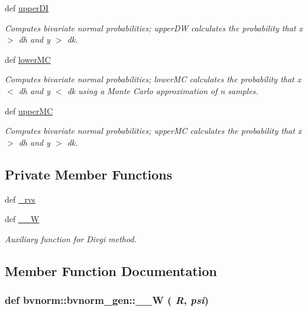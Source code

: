 \begin{CompactItemize}
def \hyperlink{classbvnorm_1_1bvnorm__gen_a21b04c4ce48d3215ead047576149238}{upperDI}
\begin{CompactList}\small\item\em Computes bivariate normal probabilities; upperDW calculates the probability that x $>$ dh and y $>$ dk. \item\end{CompactList}\item 
def \hyperlink{classbvnorm_1_1bvnorm__gen_86b9c8b6b258da3a7eb66cd91b00416b}{lowerMC}
\begin{CompactList}\small\item\em Computes bivariate normal probabilities; lowerMC calculates the probability that x $<$ dh and y $<$ dk using a Monte Carlo approximation of n samples. \item\end{CompactList}\item 
def \hyperlink{classbvnorm_1_1bvnorm__gen_65e19caa62c397d0e2de0e4d66a57d26}{upperMC}
\begin{CompactList}\small\item\em Computes bivariate normal probabilities; upperMC calculates the probability that x $>$ dh and y $>$ dk. \item\end{CompactList}\end{CompactItemize}
\subsection*{Private Member Functions}
\begin{CompactItemize}
\item 
def \hyperlink{classbvnorm_1_1bvnorm__gen_1f85ab2898c7ce352de4eaa9b47d6817}{\_\-rvs}
\item 
def \hyperlink{classbvnorm_1_1bvnorm__gen_5c395f39255b5b08cc050672e0094ca5}{\_\-\_\-W}
\begin{CompactList}\small\item\em Auxiliary function for Divgi method. \item\end{CompactList}\end{CompactItemize}


\subsection{Member Function Documentation}
\hypertarget{classbvnorm_1_1bvnorm__gen_5c395f39255b5b08cc050672e0094ca5}{
\subsubsection[{\_\-\_\-W}]{\setlength{\rightskip}{0pt plus 5cm}def bvnorm::bvnorm\_\-gen::\_\-\_\-W ( {\em R}, \/   {\em psi})}}
\label{classbvnorm_1_1bvnorm__gen_5c395f39255b5b08cc050672e0094ca5}


